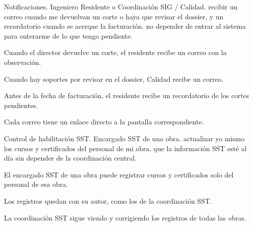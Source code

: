 \documentclass[11pt]{article}
\begin{document}
{Notificaciones.}
{Ingeniero Residente o Coordinación SIG / Calidad.}
{recibir un correo cuando me devuelvan un corte o haya que revisar el dossier, y un recordatorio cuando se acerque la facturación.}
{no depender de entrar al sistema para enterarme de lo que tengo pendiente.}
{\item Cuando el director devuelve un corte, el residente recibe un correo con la observación.
\item Cuando hay soportes por revisar en el dossier, Calidad recibe un correo.
\item Antes de la fecha de facturación, el residente recibe un recordatorio de los cortes pendientes.
\item Cada correo tiene un enlace directo a la pantalla correspondiente.}

{Control de habilitación SST.}
{Encargado SST de una obra.}
{actualizar yo mismo los cursos y certificados del personal de mi obra.}
{que la información SST esté al día sin depender de la coordinación central.}
{\item El encargado SST de una obra puede registrar cursos y certificados solo del personal de esa obra.
\item Los registros quedan con su autor, como los de la coordinación SST.
\item La coordinación SST sigue viendo y corrigiendo los registros de todas las obras.}
\end{document}

